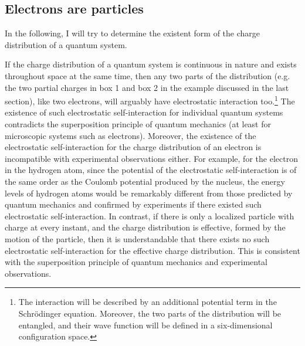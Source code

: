 \subsection{Electrons are particles}

In the following, I will try to determine the existent form of the charge distribution of a quantum system. 

If the charge distribution of a quantum system is continuous in nature and exists throughout space at the same time,  then any two parts of the distribution (e.g. the two partial charges in box 1 and box 2 in the example discussed in the last section), like two electrons, will arguably have electrostatic interaction too.\footnote{The interaction will be described by an additional potential term in the Schr\"{o}dinger equation. Moreover, the two parts of the distribution will be entangled, and their wave function will be defined in a six-dimensional configuration space.} The existence of such electrostatic self-interaction for individual quantum systems contradicts the superposition principle of quantum mechanics (at least for microscopic systems such as electrons). Moreover, the existence of the electrostatic self-interaction for the charge distribution of an electron is incompatible with experimental observations either. For example, for the electron in the hydrogen atom, since the potential of the electrostatic self-interaction is of the same order as the Coulomb potential produced by the nucleus, the energy levels of hydrogen atoms would be remarkably different from those predicted by quantum mechanics and confirmed by experiments if there existed such electrostatic self-interaction. In contrast, if there is only a localized particle with charge at every instant, and the charge distribution is effective, formed by the motion of the particle, then it is understandable that there exists no such electrostatic self-interaction for the effective charge distribution. This is consistent with the superposition principle of quantum mechanics and experimental observations.

